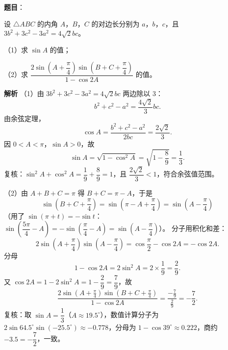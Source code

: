 \begin{answer}

\textbf{题目}：

设 $\triangle ABC$ 的内角 $A$，$B$，$C$ 的对边长分别为 $a$，$b$，$c$，且 $3b^2+3c^2-3a^2=4\sqrt2bc$。

（1）求 $\sin A$ 的值；

（2）求 $\dfrac{2\sin\left(A+\dfrac{\pi}{4}\right)\sin\left(B+C+\dfrac{\pi}{4}\right)}{1-\cos 2A}$ 的值。

\textbf{解析}
（1）由 $3b^2+3c^2-3a^2=4\sqrt2bc$ 两边除以 $3$：
\nopagebreak[4]
\[b^2+c^2-a^2=\frac{4\sqrt2}{3}bc.\]
由余弦定理，
\nopagebreak[4]
\[\cos A=\frac{b^2+c^2-a^2}{2bc}=\frac{2\sqrt2}{3}.\]
因 $0<A<\pi$，$\sin A>0$，故
\nopagebreak[4]
\[\sin A=\sqrt{1-\cos^2A}=\sqrt{1-\frac89}=\frac13.\]
复核：$\sin^2A+\cos^2A=\dfrac19+\dfrac89=1$，且 $\dfrac{2\sqrt2}{3}<1$，符合余弦值范围。

（2）由 $A+B+C=\pi$ 得 $B+C=\pi-A$，于是
\nopagebreak[4]
\[\sin\left(B+C+\frac{\pi}{4}\right)=\sin\left(\pi-A+\frac{\pi}{4}\right)=\sin\left(A-\frac{\pi}{4}\right)\]
（用了 $\sin(\pi+t)=-\sin t$：$\sin\left(\dfrac{5\pi}{4}-A\right)=-\sin\left(\dfrac{\pi}{4}-A\right)=\sin\left(A-\dfrac{\pi}{4}\right)$）。
分子用积化和差：
\nopagebreak[4]
\[2\sin\left(A+\frac{\pi}{4}\right)\sin\left(A-\frac{\pi}{4}\right)=\cos\frac{\pi}{2}-\cos2A=-\cos2A.\]
分母
\nopagebreak[4]
\[1-\cos2A=2\sin^2A=2\times\frac19=\frac29.\]
又 $\cos2A=1-2\sin^2A=1-\dfrac29=\dfrac79$，故
\nopagebreak[4]
\[\frac{2\sin\left(A+\frac{\pi}{4}\right)\sin\left(B+C+\frac{\pi}{4}\right)}{1-\cos2A}=\frac{-\frac79}{\frac29}=-\frac72.\]
复核：取 $\sin A=\dfrac13$（$A\approx19.5^\circ$），数值计算分子为 $2\sin64.5^\circ\sin(-25.5^\circ)\approx-0.778$，分母为 $1-\cos39^\circ\approx0.222$，商约 $-3.5=-\dfrac72$，一致。


\end{answer}
